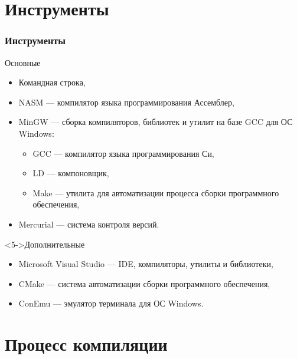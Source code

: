 \documentclass[pdf,9pt,aspectratio=169]{beamer}
\begin{document}
\section{Инструменты}

\begin{frame}\frametitle{Инструменты}
  \begin{block}{Основные}
    \begin{itemize}
      \item<1-> Командная строка,
      \item<2-> NASM --- компилятор языка программирования Ассемблер,
      \item<3-> MinGW --- сборка компиляторов, библиотек и утилит на базе GCC для ОС Windows:
      \begin{itemize}
        \item GCC --- компилятор языка программирования Си,
        \item LD --- компоновщик,
        \item Make --- утилита для автоматизации процесса сборки программного обеспечения,
      \end{itemize}
      \item<4-> Mercurial --- система контроля версий.    
    \end{itemize}      
  \end{block}
  \begin{block}<5->{Дополнительные}
    \begin{itemize}
      \item Microsoft Visual Studio --- IDE, компиляторы, утилиты и библиотеки,
      \item CMake --- система автоматизации сборки программного обеспечения,
      \item ConEmu --- эмулятор терминала для ОС Windows.
    \end{itemize}      
  \end{block}
\end{frame}

\section{Процесс компиляции}
\end{document}
